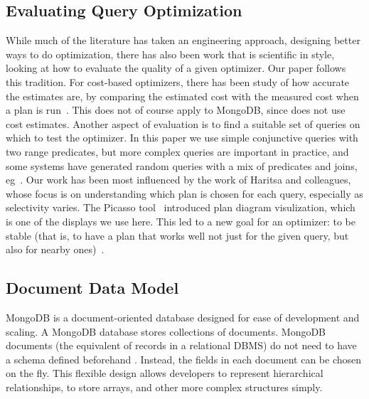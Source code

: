 \subsection{Evaluating Query Optimization}
While much of the literature has taken an engineering approach, designing better ways to do optimization, there has also been work that is scientific in style, looking at how to evaluate the quality of a given optimizer. Our paper follows this tradition. For cost-based optimizers, there has been study of how accurate the estimates are, by comparing the estimated cost with the measured cost when a plan is run~\cite{GuSW12, LeisGMBK015}. This does not of course apply to MongoDB, since \approachName does not use cost estimates. Another aspect of evaluation is to find a suitable set of queries on which to test the optimizer. In this paper we use simple conjunctive queries with two range predicates, but more complex queries are important in practice, and some systems have generated random queries with a mix of predicates and joins, eg~\cite{StillgerF95, WaasG00}. Our work has been most influenced by the work of Haritsa and colleagues, whose focus is on understanding which plan is chosen for each query, especially as selectivity varies. The Picasso tool~\cite{reddy2005analyzing, Haritsa10} introduced plan diagram visulization, which is one of the displays we use here. This led to a new goal for an optimizer: to be stable (that is, to have a plan that works well not just for the given query, but also for nearby ones)~\cite{AbhiramaBDSH10}.

\subsection{Document Data Model}
MongoDB is a document-oriented database designed for ease of development and scaling. A MongoDB database stores collections of documents. MongoDB documents (the equivalent of records in a relational DBMS) do not need to have a schema defined beforehand \cite{chandra2015base, mongodb_2019}. Instead, the fields in each document can be chosen on the fly.  This flexible design allows developers to represent hierarchical relationships, to store arrays, and other more complex structures simply.


